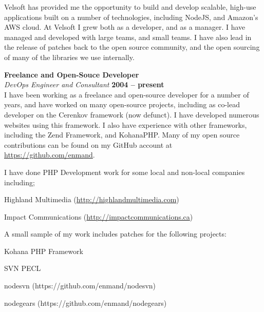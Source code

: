 \documentclass[margin,line]{resume}
\begin{document}
\begin{resume}
	Velsoft has provided me the opportunity to build and develop scalable, high-use applications built on a number of technologies, including NodeJS, and Amazon's AWS cloud. At Velsoft I grew both as a developer, and as a manager. I have managed and developed with large teams, and small teams. I have also lead in the release of patches back to the open source community, and the open sourcing of many of the libraries we use internally.

	{\bf Freelance and Open-Souce Developer} \vspace{2mm}\\\vspace{1mm}%
	{\sl DevOps Engineer and Consultant} \hfill {\bf 2004 -- present}\\
	I have been working as a freelance and open-source developer for a number of years, and have worked on many open-source projects, including as co-lead developer on the Cerenkov framework (now defunct). I have developed numerous websites using this framework. I also have experience with other frameworks, including the Zend Framework, and KohanaPHP. Many of my open source contributions can be found on my GitHub account at \href{https://github.com/enmand}{https://github.com/enmand}.

	I have done PHP Development work for some local and non-local companies including;
	\begin{list2}
		\item Highland Multimedia (\href{http://highlandmultimedia.com}{http://highlandmultimedia.com})
		\item Impact Communications (\href{impactcommunications.ca/}{http://impactcommunications.ca})
	\end{list2}


	A small sample of my work includes patches for the following projects:
	\begin{list2}
		\item Kohana PHP Framework
		\item SVN PECL
		\item nodesvn (https://github.com/enmand/nodesvn)
		\item nodegears (https://github.com/enmand/nodegears)
	\end{list2}


\end{resume}
\end{document}
